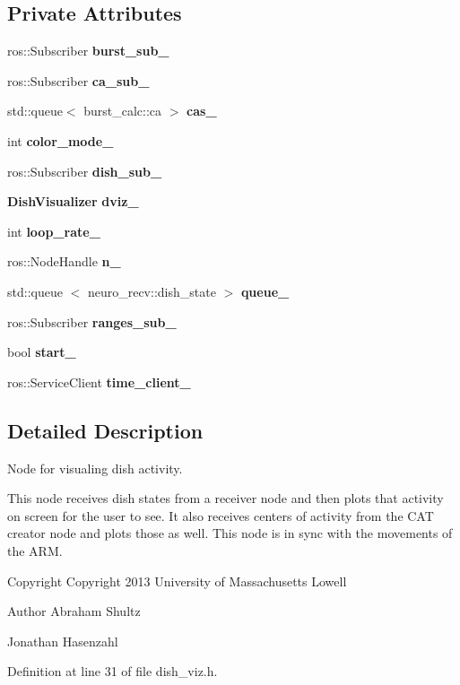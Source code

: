 \subsection*{\-Private \-Attributes}
\begin{DoxyCompactItemize}
\item 
ros\-::\-Subscriber {\bf burst\-\_\-sub\-\_\-}
\item 
ros\-::\-Subscriber {\bf ca\-\_\-sub\-\_\-}
\item 
std\-::queue$<$ burst\-\_\-calc\-::ca $>$ {\bf cas\-\_\-}
\item 
int {\bf color\-\_\-mode\-\_\-}
\item 
ros\-::\-Subscriber {\bf dish\-\_\-sub\-\_\-}
\item 
{\bf \-Dish\-Visualizer} {\bf dviz\-\_\-}
\item 
int {\bf loop\-\_\-rate\-\_\-}
\item 
ros\-::\-Node\-Handle {\bf n\-\_\-}
\item 
std\-::queue\*
$<$ neuro\-\_\-recv\-::dish\-\_\-state $>$ {\bf queue\-\_\-}
\item 
ros\-::\-Subscriber {\bf ranges\-\_\-sub\-\_\-}
\item 
bool {\bf start\-\_\-}
\item 
ros\-::\-Service\-Client {\bf time\-\_\-client\-\_\-}
\end{DoxyCompactItemize}


\subsection{\-Detailed \-Description}
\-Node for visualing dish activity. 

\-This node receives dish states from a receiver node and then plots that activity on screen for the user to see. \-It also receives centers of activity from the \-C\-A\-T creator node and plots those as well. \-This node is in sync with the movements of the \-A\-R\-M.

\begin{DoxyCopyright}{\-Copyright}
\-Copyright 2013 \-University of \-Massachusetts \-Lowell 
\end{DoxyCopyright}
\begin{DoxyAuthor}{\-Author}
\-Abraham \-Shultz 

\-Jonathan \-Hasenzahl 
\end{DoxyAuthor}


\-Definition at line 31 of file dish\-\_\-viz.\-h.



